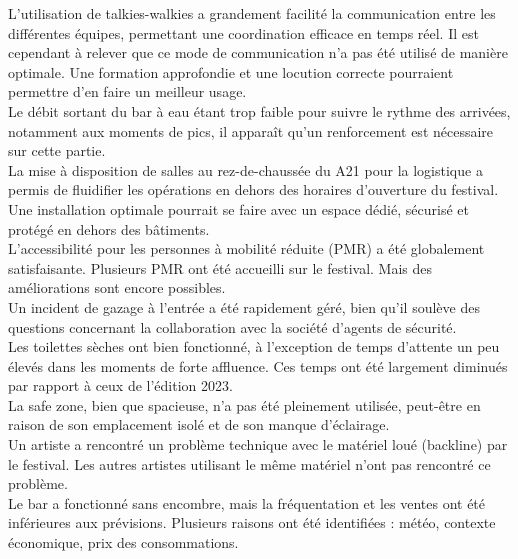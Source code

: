 \documentclass[12pt,a4paper]{report}
\begin{document}
L'utilisation de talkies-walkies a grandement facilité la communication entre les différentes équipes, permettant une coordination efficace en temps réel. Il est cependant à relever que ce mode de communication n’a pas été utilisé de manière optimale. Une formation approfondie et une locution correcte pourraient permettre d’en faire un meilleur usage.\\


Le débit sortant du bar à eau étant trop faible pour suivre le rythme des arrivées, notamment aux moments de pics, il apparaît qu’un renforcement est nécessaire sur cette partie.\\

La mise à disposition de salles au rez-de-chaussée du A21 pour la logistique a permis de fluidifier les opérations en dehors des horaires d'ouverture du festival. Une installation optimale pourrait se faire avec un espace dédié, sécurisé et protégé en dehors des bâtiments.\\

L'accessibilité pour les personnes à mobilité réduite (PMR) a été globalement satisfaisante. Plusieurs PMR ont été accueilli sur le festival. Mais des améliorations sont encore possibles.\\

Un incident de gazage à l'entrée a été rapidement géré, bien qu'il soulève des questions concernant la collaboration avec la société d'agents de sécurité.\\

Les toilettes sèches ont bien fonctionné, à l'exception de temps d’attente un peu élevés dans les moments de forte affluence. Ces temps ont été largement diminués par rapport à ceux de l’édition 2023.\\

La safe zone, bien que spacieuse, n'a pas été pleinement utilisée, peut-être en raison de son emplacement isolé et de son manque d'éclairage.\\

Un artiste a rencontré un problème technique avec le matériel loué (backline) par le festival. Les autres artistes utilisant le même matériel n’ont pas rencontré ce problème.\\

Le bar a fonctionné sans encombre, mais la fréquentation et les ventes ont été inférieures aux prévisions. Plusieurs raisons ont été identifiées : météo, contexte économique, prix des consommations.\\
\end{document}
